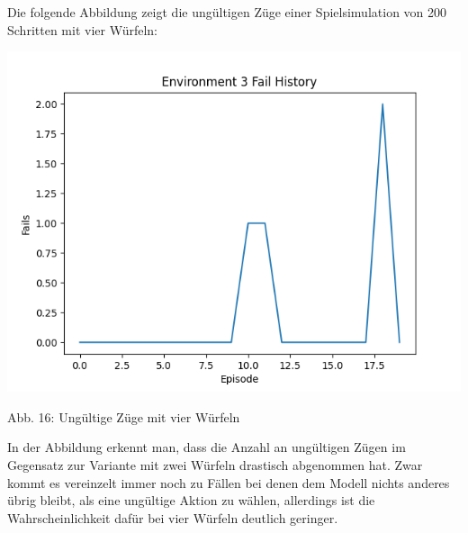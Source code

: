 \begin{minipage}{\linewidth}
Die folgende Abbildung zeigt die ungültigen Züge einer Spielsimulation von 200 Schritten mit vier Würfeln:

	\vspace{0.5cm}
	\includegraphics[width=1\textwidth]{Bilder/failswithfourdice}
	
	Abb. 16: Ungültige Züge mit vier Würfeln\\
\end{minipage}

In der Abbildung erkennt man, dass die Anzahl an ungültigen Zügen im Gegensatz zur Variante mit zwei Würfeln drastisch abgenommen hat. Zwar kommt es vereinzelt immer noch zu Fällen bei denen dem Modell nichts anderes übrig bleibt, als eine ungültige Aktion zu wählen, allerdings ist die Wahrscheinlichkeit dafür bei vier Würfeln deutlich geringer.
